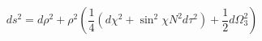 \begin{equation}
ds^2 =  d\rho^2 + \rho^2 \left( \frac{1}{4} \left( d\chi^2 + \sin^2{\chi} N^2 d\tau^2 \right) + \frac{1}{2} d\Omega^2_{3} \right)
\label{eq:cone_metric}
\end{equation}

